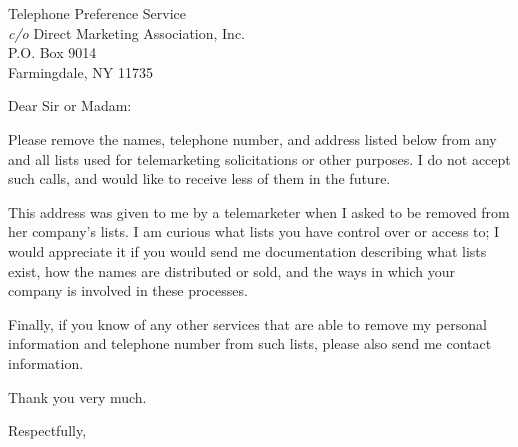 \documentclass[10pt]{letter}
\date{\today}
\begin{document}
\begin{letter}{Telephone Preference Service \\
               {\it c/o} Direct Marketing Association, Inc. \\
               P.O. Box 9014 \\
               Farmingdale, NY  11735}   
                           
\opening{Dear Sir or Madam:}

Please remove the names, telephone number, and address listed below from 
any and all lists used for telemarketing solicitations or other purposes.  
I do not accept such calls, and would like to receive less of them in 
the future.

This address was given to me by a telemarketer when I asked to be removed 
from her company's lists.  I am curious what lists you have control over 
or access to; I would appreciate it if you would send me documentation 
describing what lists exist, how the names are distributed or sold, and 
the ways in which your company is involved in these processes.  

Finally, if you know 
of any other services that are able to remove my personal information and 
telephone number from such lists, please also send me contact information.

Thank you very much.

\closing{Respectfully,}

\end{letter}
\end{document}
